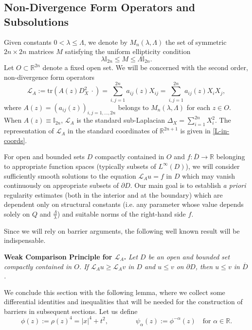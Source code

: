 \documentclass[12pt]{amsart}
\newcommand{\Lop}{\mathcal{L}}
\newcommand{\R}{{\mathbb R}}
\def \L {\mathcal{L}}
\def \a {\alpha}
\begin{document}
\subsection{Non-Divergence Form Operators and Subsolutions}
Given constants $0<\lambda\leq \Lambda$, we denote by $M_n(\lambda,\Lambda)$ the set of symmetric $2n\times 2n$ matrices $M$ satisfying the uniform ellipticity condition
\begin{equation}\label{ellipticity}
\lambda \mathbb{I}_{2n} \leq M \leq \Lambda \mathbb{I}_{2n}.
\end{equation}
Let $O \subset \R^{2n}$ denote a fixed open set. We will be concerned with the second order, non-divergence form operators
\begin{equation}\label{operator-definition}
\mathcal{L}_A := \text{tr}\left(A(z) D^2_X \ \cdot \right) = \sum\limits_{i,j = 1}^{2n} a_{ij}(z) X_{ij} = \sum\limits_{i,j = 1}^{2n} a_{ij}(z) X_i X_j,
\end{equation}
where $A(z) = (a_{ij}(z))_{i,j = 1,\ldots, 2n}$ belongs to $M_n(\lambda,\Lambda)$ for each $z\in O$. When $A(z) \equiv \mathbb{I}_{2n}$, $\L_A$ is the standard sub-Laplacian $\Delta_X = \sum\limits_{i=1}^{2n} X_i^2$. The representation of $\L_A$ in the standard coordinates of $\R^{2n+1}$ is given in \eqref{L-in-coords}.

For open and bounded sets $D$ compactly contained in $O$ and $f : \overline{D} \to \R$ belonging to appropriate function spaces (typically subsets of $L^{\infty}(D)$), we will consider sufficiently smooth solutions to the equation $\Lop_A u= f$ in $D$ which may vanish continuously on appropriate subsets of $\partial D$. Our main goal is to establish \emph{a priori} regularity estimates (both in the interior and at the boundary) which are dependent only on structural constants (i.e. any parameter whose value depends solely on $Q$ and $\frac{\Lambda}{\lambda}$) and suitable norms of the right-hand side $f$. 

Since we will rely on barrier arguments, the following well known result will be indispensable.

\medskip
 
\noindent \textbf{Weak Comparison Principle for $\L_A$.}
\emph{
Let $D$ be an open and bounded set compactly contained in $O$. If  $\Lop_A u \geq \Lop_A v$ in $D$ and $u \leq v$ on $\partial D$, then $u \leq v$ in $\overline{D}$.}
\vskip 0.3cm

We conclude this section with the following lemma, where we collect some differential identities and inequalities that will be needed for the construction of barriers in subsequent sections. Let us define
\begin{equation}\label{defPhiPsi}
\phi(z) := \rho(z)^4 = |x|^4 + t^2,\quad\qquad\quad \psi_{\a}(z) := \phi^{-\a}(z) \quad \text{for } \a \in \R.
\end{equation}
\end{document}
